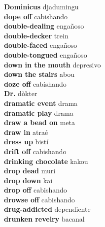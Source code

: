 \textbf{ Dominicus  } djadumingu \\
\textbf{ dope off  } cabishando \\
\textbf{ double-dealing  } engañoso \\
\textbf{ double-decker  } trein \\
\textbf{ double-faced  } engañoso \\
\textbf{ double-tongued  } engañoso \\
\textbf{ down in the mouth  } depresivo \\
\textbf{ down the stairs  } abou \\
\textbf{ doze off  } cabishando \\
\textbf{ Dr.  } dòkter \\
\textbf{ dramatic event  } drama \\
\textbf{ dramatic play  } drama \\
\textbf{ draw a bead on  } meta \\
\textbf{ draw in  } atraé \\
\textbf{ dress up  } bistí \\
\textbf{ drift off  } cabishando \\
\textbf{ drinking chocolate  } kakou \\
\textbf{ drop dead  } muri \\
\textbf{ drop down  } kai \\
\textbf{ drop off  } cabishando \\
\textbf{ drowse off  } cabishando \\
\textbf{ drug-addicted  } dependiente \\
\textbf{ drunken revelry  } bacanal \\
